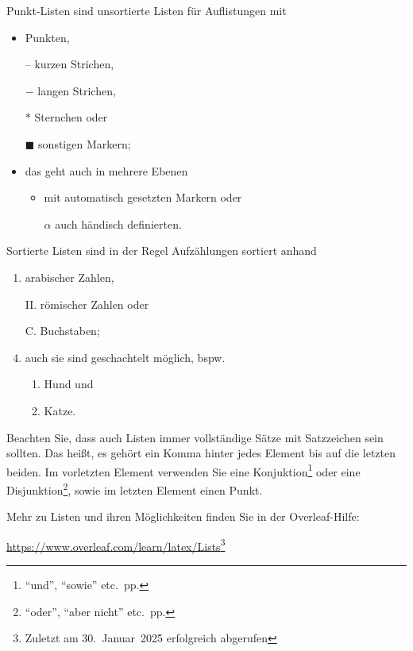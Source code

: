 Punkt-Listen sind unsortierte Listen für Auflistungen mit
\begin{itemize}
    \item Punkten,    
    \item[--] kurzen Strichen,
    \item[$-$] langen Strichen,
    \item[$\ast$] Sternchen oder
    \item[$\blacksquare$] sonstigen Markern;
    \item{
        das geht auch in mehrere Ebenen 
        \begin{itemize}
            \item mit automatisch gesetzten Markern oder
            \item[$\alpha$] auch händisch definierten.
        \end{itemize}
    }
\end{itemize}

Sortierte Listen sind in der Regel Aufzählungen sortiert anhand
\begin{enumerate}
    \item arabischer Zahlen,
    \item[II.] römischer Zahlen oder
    \item[C.] Buchstaben;
    \setcounter{enumi}{3}
    \item{
        auch sie sind geschachtelt möglich, bspw.
        \begin{enumerate}
            \item Hund und
            \item Katze.
        \end{enumerate}
    }
\end{enumerate}

Beachten Sie, dass auch Listen immer vollständige Sätze mit Satzzeichen sein sollten. Das heißt, es gehört ein Komma hinter jedes Element bis auf die letzten beiden. Im vorletzten Element verwenden Sie eine Konjuktion\footnote{\enquote{und}, \enquote{sowie} etc.~pp.} oder eine Disjunktion\footnote{\enquote{oder}, \enquote{aber nicht} etc.~pp.}, sowie im letzten Element einen Punkt.

Mehr zu Listen und ihren Möglichkeiten finden Sie in der Overleaf-Hilfe:
\begin{center}
    \url{https://www.overleaf.com/learn/latex/Lists}\footnote{Zuletzt am 30.~Januar~2025 erfolgreich abgerufen}
\end{center}

